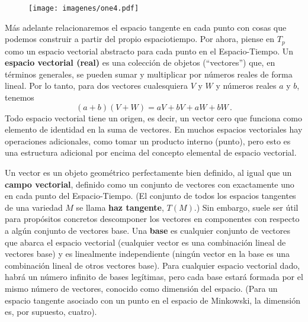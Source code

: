 \documentclass[11pt,b5paper,openany,twoside]{book}
\begin{document}
\begin{figure}[h]
\centering
\texttt{[image: imagenes/one4.pdf]}
\end{figure}

Más adelante relacionaremos el espacio tangente en cada punto con cosas que podemos construir a partir del propio espaciotiempo.
Por ahora, piense en $T_p$ como un espacio vectorial abstracto para cada punto en el Espacio-Tiempo.
Un {\bf espacio vectorial (real)} es una colección de objetos (``vectores'') que, en términos generales, se pueden sumar y multiplicar por números reales de forma lineal.
Por lo tanto, para dos vectores cualesquiera $V$ y $W$ y números reales $a$ y $b$, tenemos
\begin{equation}
(a+b)(V+W) = aV+bV+aW+bW\,.\label{1.22}
\end{equation}
Todo espacio vectorial tiene un origen, es decir, un vector cero que funciona como elemento de identidad en la suma de vectores.
En muchos espacios vectoriales hay operaciones adicionales, como tomar un producto interno (punto), pero esto es una estructura adicional por encima del concepto elemental de espacio vectorial.

Un vector es un objeto geométrico perfectamente bien definido, al igual que un {\bf campo vectorial}, definido como un conjunto de vectores con exactamente uno en cada punto del Espacio-Tiempo.
(El conjunto de todos los espacios tangentes de una variedad $M$ se llama {\bf haz tangente}, $T(M)$.)
Sin embargo, suele ser útil para propósitos concretos descomponer los vectores en componentes con respecto a algún conjunto de vectores base.
Una {\bf base} es cualquier conjunto de vectores que abarca el espacio vectorial (cualquier vector es una combinación lineal de vectores base) y es linealmente independiente (ningún vector en la base es una combinación lineal de otros vectores base).
Para cualquier espacio vectorial dado, habrá un número infinito de bases legítimas, pero cada base estará formada por el mismo número de vectores, conocido como dimensión del espacio.
(Para un espacio tangente asociado con un punto en el espacio de Minkowski, la dimensión es, por supuesto, cuatro).
\end{document}
